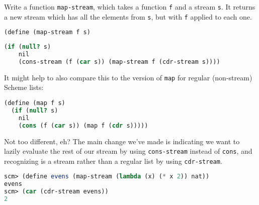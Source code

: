 \question Write a function \texttt{map-stream}, which takes a function
\texttt{f} and a stream \texttt{s}. It returns a new stream which has all the
elements from \texttt{s}, but with \texttt{f} applied to each one.
\begin{lstlisting}[language=Scheme]
(define (map-stream f s)
\end{lstlisting}
\begin{solution}[1in]
\begin{lstlisting}[language=Scheme]
  (if (null? s)
    nil
    (cons-stream (f (car s)) (map-stream f (cdr-stream s))))
\end{lstlisting}

It might help to also compare this to the version of \texttt{map} for regular
(non-stream) Scheme lists:
\begin{lstlisting}[language=Scheme]
(define (map f s)
  (if (null? s)
    nil
    (cons (f (car s)) (map f (cdr s)))))
\end{lstlisting}

Not too different, eh? The main change we've made is indicating we want to
lazily evaluate the rest of our stream by using \texttt{cons-stream} instead of
\texttt{cons}, and recognizing is a stream rather than a regular list by using
\texttt{cdr-stream}.
\end{solution}
\begin{lstlisting}[language=Scheme]
scm> (define evens (map-stream (lambda (x) (* x 2)) nat))
evens
scm> (car (cdr-stream evens))
2
\end{lstlisting}
